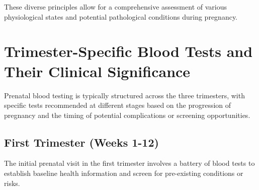\documentclass{article}
\begin{document}
These diverse principles allow for a comprehensive assessment of various physiological states and potential pathological conditions during pregnancy.

\section{Trimester-Specific Blood Tests and Their Clinical Significance}

Prenatal blood testing is typically structured across the three trimesters, with specific tests recommended at different stages based on the progression of pregnancy and the timing of potential complications or screening opportunities.

\subsection{First Trimester (Weeks 1-12)}
The initial prenatal visit in the first trimester involves a battery of blood tests to establish baseline health information and screen for pre-existing conditions or risks.
\end{document}
